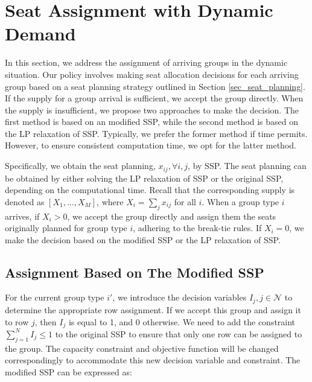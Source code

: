 \section{Seat Assignment with Dynamic Demand}\label{sec_dynamic}

In this section, we address the assignment of arriving groups in the dynamic situation. Our policy involves making seat allocation decisions for each arriving group based on a seat planning strategy outlined in Section \ref{sec_seat_planning}. If the supply for a group arrival is sufficient, we accept the group directly. When the supply is insufficient, we propose two approaches to make the decision. The first method is based on an modified SSP, while the second method is based on the LP relaxation of SSP. Typically, we prefer the former method if time permits. However, to ensure consistent computation time, we opt for the latter method.


Specifically, we obtain the seat planning, $x_{ij}, \forall i,j$, by SSP. The seat planning can be obtained by either solving the LP relaxation of SSP or the original SSP, depending on the computational time. Recall that the corresponding supply is denoted as $[X_1, \ldots, X_M]$, where $X_i = \sum_{j} x_{ij}$ for all $i$. When a group type $i$ arrives, if $X_i > 0$, we accept the group directly and assign them the seats originally planned for group type $i$, adhering to the break-tie rules. If $X_i = 0$, we make the decision based on the modified SSP or the LP relaxation of SSP.

\subsection{Assignment Based on The Modified SSP}
For the current group type $i{'}$, we introduce the decision variables $I_j, j \in \mathcal{N}$ to determine the appropriate row assignment. If we accept this group and assign it to row $j$, then $I_j$ is equal to 1, and 0 otherwise. We need to add the constraint $\sum_{j=1}^{N} I_j \leq 1$ to the original SSP to ensure that only one row can be assigned to the group. The capacity constraint and objective function will be changed correspondingly to accommodate this new decision variable and constraint. The modified SSP can be expressed as:

